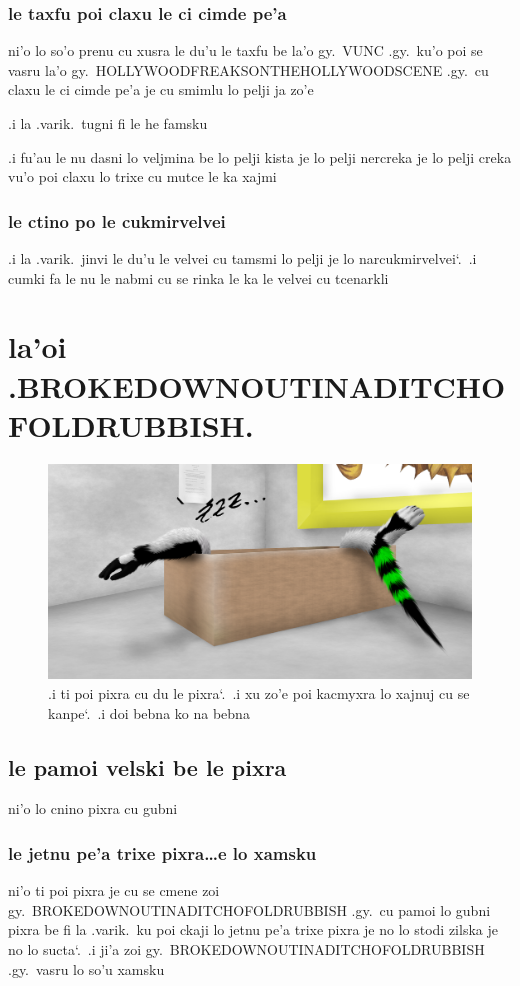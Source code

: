 \documentclass{report}
\newcommand\sds{\spacefactor\sfcode`.\ \space}
\begin{document}
\subsection{le taxfu poi claxu le ci cimde pe'a}
ni'o lo so'o prenu cu xusra le du'u le taxfu be la'o gy.\ VUNC .gy.\ ku'o poi se vasru la'o gy.\ HOLLYWOODFREAKSONTHEHOLLYWOODSCENE .gy.\ cu claxu le ci cimde pe'a je cu smimlu lo pelji ja zo'e

.i la .varik.\ tugni fi le he famsku

.i fu'au le nu dasni lo veljmina be lo pelji kista je lo pelji nercreka je lo pelji creka vu'o poi claxu lo trixe cu mutce le ka xajmi

\subsection{le ctino po le cukmirvelvei}
.i la .varik.\ jinvi le du'u le velvei cu tamsmi lo pelji je lo narcukmirvelvei\sds  .i cumki fa le nu le nabmi cu se rinka le ka le velvei cu tcenarkli

\chapter{la'oi .BROKEDOWNOUTINADITCHOFOLDRUBBISH.}
\begin{figure}[ht]
	\centering
	\includegraphics[width=\textwidth]{brokedownoutinaditchofoldrubbish/brokedownoutinaditchofoldrubbish.png}
	\caption[center]{.i ti poi pixra cu du le pixra\sds  .i xu zo'e poi kacmyxra lo xajnuj cu se kanpe\sds  .i doi bebna ko na bebna}
\end{figure}
\section{le pamoi velski be le pixra}
ni'o lo cnino pixra cu gubni

\subsection{le jetnu pe'a trixe pixra\ldots e lo xamsku}
ni'o ti poi pixra je cu se cmene zoi gy.\ BROKEDOWNOUTINADITCHOFOLDRUBBISH .gy.\ cu pamoi lo gubni pixra be fi la .varik.\ ku poi ckaji lo jetnu pe'a trixe pixra je no lo stodi zilska je no lo sucta\sds  .i ji'a zoi gy.\ BROKEDOWNOUTINADITCHOFOLDRUBBISH .gy.\ vasru lo so'u xamsku
\end{document}
